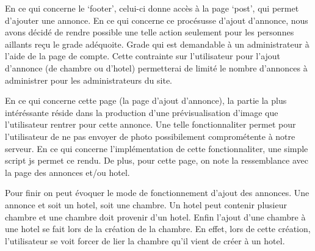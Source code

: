 \documentclass[12pt]{article}
\begin{document}
    En ce qui concerne le `footer', celui-ci donne accès à la page `post', qui 
    permet d'ajouter une annonce. En ce qui concerne ce procésusse d'ajout 
    d'annonce, nous avons décidé de rendre possible une telle action seulement
    pour les personnes aillants reçu le grade adéquoite. Grade qui est 
    demandable à un administrateur à l'aide de la page de compte. Cette 
    contrainte sur l'utilisateur pour l'ajout d'annonce (de chambre ou d'hotel) 
    permetterai de limité le nombre d'annonces à administrer pour les 
    administrateurs du site.
    
    En ce qui concerne cette page (la page d'ajout d'annonce), la partie la plus 
    intéréssante réside dans la production d'une prévisualisation d'image que 
    l'utilisateur rentrer pour cette annonce. Une telle fonctionnaliter permet 
    pour l'utilisateur de ne pas envoyer de photo possibilement comprométente à 
    notre serveur. En ce qui concerne l'implémentation de cette fonctionnaliter, 
    une simple script js permet ce rendu. De plus, pour cette page, on note la 
    ressemblance avec la page des annonces et/ou hotel. 

    Pour finir on peut évoquer le mode de fonctionnement d'ajout des annonces. 
    Une annonce et soit un hotel, soit une chambre. Un hotel peut contenir 
    plusieur chambre et une chambre doit provenir d'un hotel. Enfin l'ajout 
    d'une chambre à une hotel se fait lors de la création de la chambre. 
    En effet, lors de cette création, l'utilisateur se voit forcer de lier la 
    chambre qu'il vient de créer à un hotel. 
    
\end{document}
